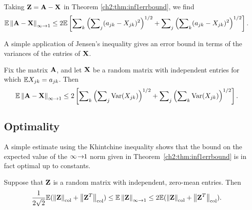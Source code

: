 Taking $\mathbf{Z}=\mathbf{A}-\mathbf{X}$ in Theorem \ref{ch2:thm:inf1errbound},
we find 
\[
\mathbb{E}\left\|\mathbf{A}-\mathbf{X}\right\|_{\infty\rightarrow 1}\leq2\mathbb{E}\left[\sum\nolimits_{k}\left(\sum\nolimits_{j
}(a_{jk}-X_{jk})^{2}\right)^{1/2}+\sum\nolimits_{j}\left(\sum\nolimits_{k}(a_{jk
}-X_{jk})^{2}\right)^{1/2}\right].\]

A simple application of Jensen's inequality gives an error bound in terms of the
variances of the entries of $\mathbf{X}$. 
\begin{cor}
Fix the matrix $\mathbf{A}$, and let $\mathbf{X}$ be a random matrix with independent
entries for which $\mathbb{E} X_{jk}=a_{jk}$. Then 
\[
\mathbb{E}\left\|\mathbf{A}-\mathbf{X}\right\|_{\infty\rightarrow 1}\leq2\left[\sum\nolimits_{k}\left(\sum\nolimits_{j}
\operatorname{Var}(X_{jk})\right)^{1/2}+\sum\nolimits_{j}\left(\sum\nolimits_{k}\operatorname{Var}(X_{jk})
\right)^{1/2}\right].
\]
\label{ch2:cor:inf1errbound}
\end{cor}

\subsection{Optimality}

A simple estimate using the Khintchine inequality shows that the bound on the expected value of
the $\infty\!\rightarrow\!\!1$ norm given in Theorem~\ref{ch2:thm:inf1errbound} is in fact optimal up to constants.

\begin{cor}
Suppose that $\mathbf{Z}$ is a random matrix with independent, zero-mean entries.
Then 
\[
\frac{1}{2 \sqrt{2}} \mathbb{E}(\left\|\mathbf{Z}\right\|_{\mathrm{col}} + \left\|\mathbf{Z}^T\right\|_{\mathrm{col}}) \leq 
 \mathbb{E}\left\|\mathbf{Z}\right\|_{\infty\rightarrow 1} \leq 2\mathbb{E}(\left\|\mathbf{Z}\right\|_{\mathrm{col}}+\left\|\mathbf{Z}^{T}\right\|_{\mathrm{col}}).
\]
\label{ch2:cor:inf1optimality}
\end{cor}

